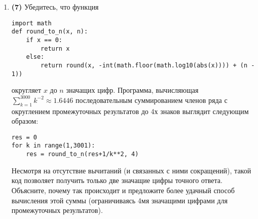 \documentclass[prb,papersize=a4paper,notitlepage]{revtex4-1}%
\begin{document}
\begin{enumerate}
\item \textbf{(7)} Убедитесь, что функция
\lstset{language=Python}
\lstset{frame=lines}
\lstset{basicstyle=\ttfamily}
\begin{lstlisting}
import math
def round_to_n(x, n): 
    if x == 0:
        return x
    else:
        return round(x, -int(math.floor(math.log10(abs(x)))) + (n - 1))
\end{lstlisting}
округляет $x$ до $n$ значащих цифр.
Программа, вычисляющая $\sum_{k=1}^{3000}k^{-2}\approx 1.6446$ последовательным суммированием членов ряда с округлением промежуточных результатов до 4х знаков выглядит следующим образом:
\lstset{language=Python}
\lstset{frame=lines}
\lstset{basicstyle=\ttfamily}
\begin{lstlisting}
res = 0
for k in range(1,3001):
    res = round_to_n(res+1/k**2, 4)
\end{lstlisting}
Несмотря на отсутствие вычитаний (и связанных с ними сокращений), такой код позволяет получить только две значащие цифры точного ответа. Объясните, почему так происходит и предложите более удачный способ вычисления этой суммы (ограничиваясь 4мя значащими цифрами для промежуточных результатов).
\end{enumerate}
\end{document}

